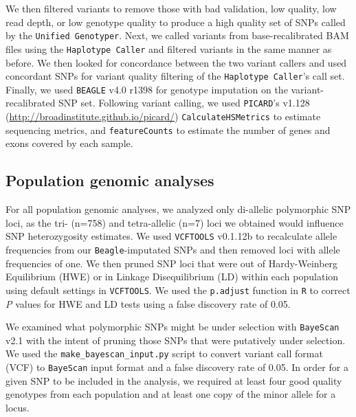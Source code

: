 \documentclass[english]{article}\usepackage[]{graphicx}\usepackage[]{color}
\begin{document}
We then filtered variants to remove those with bad validation, low quality, low read depth, or low genotype quality to produce a high quality set of SNPs called by the \texttt{Unified Genotyper}. Next, we called variants from base-recalibrated BAM files using the \texttt{Haplotype Caller} and filtered variants in the same manner as before. We then looked for concordance between the two variant callers and used concordant SNPs for variant quality filtering of the \texttt{Haplotype Caller}'s call set. Finally, we used \texttt{BEAGLE} v4.0 r1398 \citep{Browning_and_Browning_2007} for genotype imputation on the variant-recalibrated SNP set. Following variant calling, we used \texttt{PICARD}'s v1.128 (\url{http://broadinstitute.github.io/picard/}) \texttt{CalculateHSMetrics} to estimate sequencing metrics, and \texttt{featureCounts} \citep{Liao_et_al_2014} to estimate the number of genes and exons covered by each sample.

\subsection*{Population genomic analyses}
For all population genomic analyses, we analyzed only di-allelic polymorphic SNP loci, as the tri- (n=758) and tetra-allelic (n=7) loci we obtained would influence SNP heterozygosity estimates. We used \texttt{VCFTOOLS} v0.1.12b \citep{Danecek_et_al_2011} to recalculate allele frequencies from our \texttt{Beagle}-imputated SNPs and then removed loci with allele frequencies of one. We then pruned SNP loci that were out of Hardy-Weinberg Equilibrium (HWE) or in Linkage Disequilibrium (LD) within each population using default settings in \texttt{VCFTOOLS}. We used the \texttt{p.adjust} function in \texttt{R} \citep{R_Core_Team} to correct \textit{P} values for HWE and LD tests using a false discovery rate \citep{Benjamini_and_Hochberg_1995} of 0.05. 

We examined what polymorphic SNPs might be under selection with \texttt{BayeScan} v2.1 \citep{Foll_and_Gaggiotti_2008} with the intent of pruning those SNPs that were putatively under selection. We used the \texttt{make\_bayescan\_input.py} script to convert variant call format (VCF) to \texttt{BayeScan} input format \citep{De_Wit_et_al_2012} and a false discovery rate of 0.05. In order for a given SNP to be included in the analysis, we required at least four good quality genotypes from each population and at least one copy of the minor allele for a locus.
\end{document}
